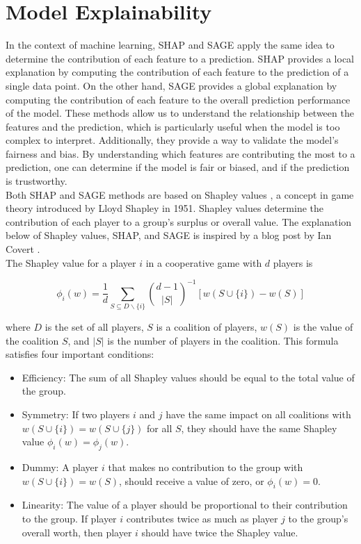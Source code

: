 \section{Model Explainability}
In the context of machine learning, SHAP \cite{SHAP} and SAGE \cite{SAGE} apply the same idea to determine the contribution of each feature to a prediction.
SHAP provides a local explanation by computing the contribution of each feature to the prediction of a single data point.
On the other hand, SAGE provides a global explanation by computing the contribution of each feature to the overall prediction performance of the model.
These methods allow us to understand the relationship between the features and the prediction, which is particularly useful when the model is too complex to interpret.
Additionally, they provide a way to validate the model's fairness and bias.
By understanding which features are contributing the most to a prediction, one can determine if the model is fair or biased, and if the prediction is trustworthy.\\

Both SHAP and SAGE methods are based on Shapley values \cite{shapley_value_1953}, a concept in game theory introduced by Lloyd Shapley in 1951.
Shapley values determine the contribution of each player to a group's surplus or overall value.
The explanation below of Shapley values, SHAP, and SAGE is inspired by a blog post by Ian Covert \cite{covert_shap_sage}.\\

The Shapley value for a player $i$ in a cooperative game with $d$ players is

\begin{equation}
    \phi_i(w) = \frac{1}{d} \sum_{S \subseteq D \backslash \{ i \} } \binom{d-1}{|S|}^{-1} \left[ w(S\cup \{ i \} ) - w(S) \right]
\end{equation}

where $D$ is the set of all players, $S$ is a coalition of players, $w(S)$ is the value of the coalition $S$, and $|S|$ is the number of players in the coalition.
This formula satisfies four important conditions:
\begin{itemize}
    \item Efficiency: The sum of all Shapley values should be equal to the total value of the group.
    \item Symmetry: If two players $i$ and $j$ have the same impact on all coalitions with $w(S \cup \{i\}) = w(S \cup \{j\})$ for all $S$, they should have the same Shapley value $\phi_i(w) = \phi_j(w)$.
    \item Dummy: A player $i$ that makes no contribution to the group with $w(S \cup \{i\}) = w(S)$, should receive a value of zero, or $\phi_i(w)=0$.
    \item Linearity: The value of a player should be proportional to their contribution to the group.
If player $i$ contributes twice as much as player $j$ to the group's overall worth, then player $i$ should have twice the Shapley value.
\end{itemize}

